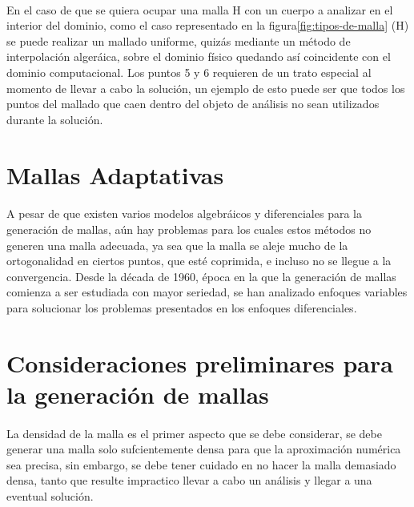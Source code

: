 \documentclass[letterpaper, openright, 12pt]{book}
\begin{document}
    \paragraph*{}
        En el caso de que se quiera ocupar una malla H con un cuerpo a analizar
        en el interior del dominio, como el caso representado en la figura\ref*{fig:tipos-de-malla} (H)
        se puede realizar un mallado uniforme, quizás mediante un método de
        interpolación algeráica, sobre el dominio físico quedando así
        coincidente con el dominio computacional. Los puntos 5 y 6 requieren de
        un trato especial al momento de llevar a cabo la solución, un ejemplo de
        esto puede ser que todos los puntos del mallado que caen dentro del
        objeto de análisis no sean utilizados durante la solución.

    \section{Mallas Adaptativas}
    \paragraph*{}
        A pesar de que existen varios modelos algebráicos y diferenciales para
        la generación de mallas, aún hay problemas para los cuales estos métodos
        no generen una malla adecuada, ya sea que la malla se aleje mucho de la
        ortogonalidad en ciertos puntos, que esté coprimida, e incluso no se
        llegue a la convergencia. Desde la década de 1960, época en la que la
        generación de mallas comienza a ser estudiada con mayor seriedad, se han
        analizado enfoques variables para solucionar los problemas presentados
        en los enfoques diferenciales.

    \section{Consideraciones preliminares para la generación de mallas}
    \paragraph*{}
        La densidad de la malla es el primer aspecto que se debe considerar, se
        debe generar una malla solo sufcientemente densa para que la
        aproximación numérica sea precisa, sin embargo, se debe tener cuidado en
        no hacer la malla demasiado densa, tanto que resulte impractico llevar a
        cabo un análisis y llegar a una eventual solución.
\end{document}
